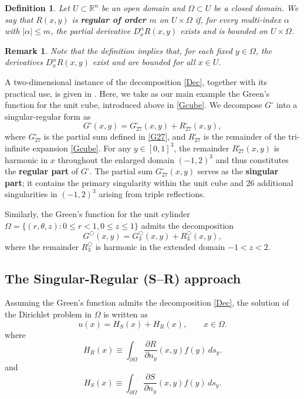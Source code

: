 \documentclass[12pt,oneside,reqno]{amsart}%
\theoremstyle{plain}
\newtheorem{definition}[theorem]{Definition}
\newtheorem{remark}[theorem]{Remark}
\numberwithin{equation}{section}
\begin{document}
\begin{definition}
Let $U \subset \mathbb{R}^n$ be an open domain 
and $\Omega \subset U$ be a closed domain. 
We say that $R(x,y)$ is \textbf{regular of order $m$} 
on $U \times \Omega$ if, for every multi-index $\alpha$ 
with $|\alpha| \le m$, the partial derivative 
$D_x^\alpha R(x,y)$ exists and is bounded 
on $U \times \Omega$.
\end{definition}

\begin{remark}
Note that the definition implies that, 
for each fixed $y \in \Omega$, 
the derivatives $D_x^\alpha R(x,y)$ exist 
and are bounded for all $x \in U$.
\end{remark}

A two-dimensional instance of the decomposition \eqref{Dec}, together with 
its practical use, is given in \cite{Levin1980}. Here, we take as our main example the Green's function for the unit cube, 
introduced above in \eqref{Gcube}.
We decompose $G^\square$ into a singular-regular form as
\begin{equation}
G^\square(x,y) = G^\square_{27}(x,y) + R^\square_{27}(x,y),
\label{SRcube}
\end{equation}
where $G^\square_{27}$ is the partial sum defined in \eqref{G27}, 
and $R^\square_{27}$ is the remainder of the tri-infinite 
expansion \eqref{Gcube}. For any $y \in [0,1]^3$, 
the remainder $R^\square_{27}(x,y)$ is harmonic in $x$ 
throughout the enlarged domain $(-1,2)^3$ and thus 
constitutes the \textbf{regular part} of $G^{\square}$. 
The partial sum $G^\square_{27}(x,y)$ serves as the 
\textbf{singular part}; it contains the primary singularity 
within the unit cube and 26 additional singularities 
in $(-1,2)^3$ arising from triple reflections.

Similarly, the Green's function for the unit cylinder 
$\Omega = \{ (r, \theta, z) : 0 \le r < 1, 0 \le z \le 1 \}$ 
admits the decomposition
\begin{equation}
G^\bigcirc(x,y) = G^\bigcirc_3(x,y) + R^\bigcirc_3(x,y),
\label{SRcyl}
\end{equation}
where the remainder $R^\bigcirc_3$ is harmonic 
in the extended domain $-1 < z < 2$.

\subsection{The Singular-Regular (S--R) approach}\hfill

Assuming the Green's function admits the decomposition \eqref{Dec}, the solution of the Dirichlet problem in $\Omega$ is written as 
\begin{equation}
\label{eq:SR}
u(x) 
= H_S(x)+H_R(x),
\qquad x \in \Omega.
\end{equation}
where
\begin{equation}\label{H_R}
H_R(x)\equiv \int_{\partial\Omega}
    \frac{\partial R}{\partial n_y}(x,y)f(y)\, ds_y .
\end{equation}
and
\begin{equation}\label{H_S}
H_S(x)\equiv \int_{\partial\Omega}
    \frac{\partial S}{\partial n_y}(x,y)f(y)\, ds_y .
\end{equation}
\end{document}
